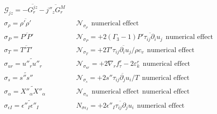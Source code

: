 \documentclass[10pt,paper=a4]{report}
\newcommand{\eht}{\overline}
\newcommand{\fht}{\widetilde}
\begin{document}
\begin{table*}
\begin{align}
& \mathcal G_{jz} = -\eht{G_{r}^{jz}} - \eht{j''_z G_r^M}  & &  \nonumber \\
& \sigma_\rho = \eht{\rho'\rho'} & & \mathcal N_{\sigma_\rho} \ \ \mbox{numerical effect} \nonumber \\
& \sigma_P = \eht{P'P'} & & \mathcal N_{\sigma_P} = +2 (\Gamma_3 -1)\eht{P'\tau_{ij}\partial_i u_j} \ \ \mbox{numerical effect} \nonumber \\
& \sigma_T = \eht{T'T'} & & \mathcal N_{\sigma_T} = +\eht{2 T' \tau_{ij} \partial_i u_j / \rho c_v} \ \ \mbox{numerical effect} \nonumber \\
& \sigma_{ur} = \fht{u''_r u''_r} & & \mathcal N_{\sigma_{ur}} = +2\nabla_r f_{\tau}^r - 2\varepsilon_{k}^r \ \ \mbox{numerical effect} \nonumber \\
& \sigma_{s} =  \fht{s''s''} & & \mathcal N_{\sigma_s} = +  2 \eht{s'' \tau_{ij} \partial_j u_i / T} \ \ \mbox{numerical effect} \nonumber \\
& \sigma_\alpha = \fht{X''_\alpha X''_\alpha} & & \mathcal N_{\sigma_\alpha} \ \ \mbox{numerical effect} \ \ \mbox{numerical effect} \nonumber \\
& \sigma_{\epsilon I} = \fht{\epsilon''_I \epsilon''_I} & &  N_{\sigma \epsilon_I} =  + 2\eht{\epsilon''_I \tau_{ij} \partial_j u_i} \ \ \mbox{numerical effect} \nonumber
\end{align}
\end{table*}

\newpage
\end{document}
